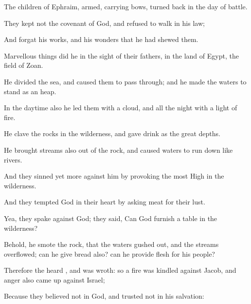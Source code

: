 {\Q {}The
children of
Ephraim,
{}
armed,
{}
carrying
bows, turned
back in the
day of
battle.


\par }{\Q {}They
kept not the
covenant of
God, and
refused to
walk in his
law;


\par }{\Q {}And
forgat his
works, and his
wonders that he had
shewed them.


\par }{\Q {}Marvellous
things
did he in the
sight of their
fathers, in the
land of
Egypt,
{} the
field of
Zoan.


\par }{\Q {}He
divided the
sea, and caused them to pass
through; and he made the
waters to
stand as an
heap.


\par }{\Q {}In the
daytime also he
led them with a
cloud, and all the
night with a
light of
fire.


\par }{\Q {}He
clave the
rocks in the
wilderness, and gave
{}
drink as
{} the
great
depths.


\par }{\Q {}He
brought
streams also out of the
rock, and caused
waters to run
down like
rivers.


\par }{\Q {}And they
sinned yet
more against him by
provoking the most
High in the
wilderness.


\par }{\Q {}And they
tempted
God in their
heart by
asking
meat for their
lust.


\par }{\Q {}Yea, they
spake against
God; they
said,
Can
God
furnish a
table in the
wilderness?


\par }{\Q {}Behold, he
smote the
rock, that the
waters gushed
out, and the
streams
overflowed;
can he
give
bread also?
can he
provide
flesh for his
people?


\par }{\Q {}Therefore the
{}
heard
{}, and was
wroth: so a
fire was
kindled against
Jacob, and
anger also came
up against
Israel;


\par }{\Q {}Because they
believed not in
God, and
trusted not in his
salvation:


}
